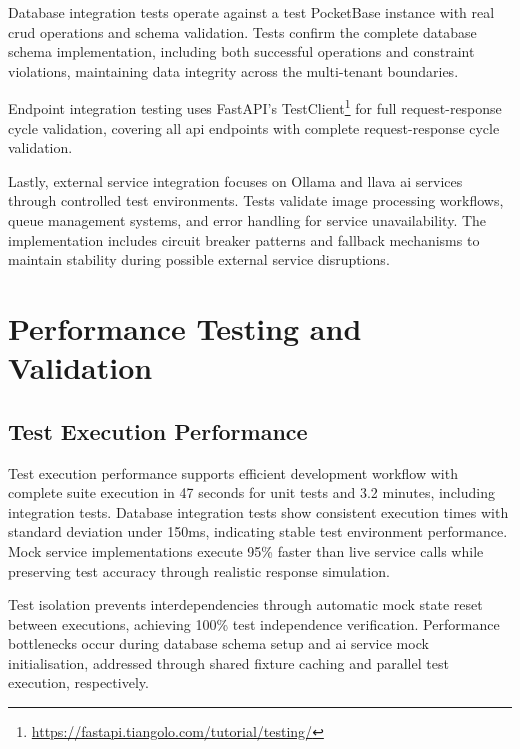 Database integration tests operate against a test PocketBase instance with real \ac{crud} operations and schema validation. Tests confirm the complete database schema implementation, including both successful operations and constraint violations, maintaining data integrity across the multi-tenant boundaries.

Endpoint integration testing uses FastAPI's TestClient\footnote{\url{https://fastapi.tiangolo.com/tutorial/testing/}} for full request-response cycle validation, covering all \ac{api} endpoints with complete request-response cycle validation.

Lastly, external service integration focuses on Ollama and \ac{llava} \ac{ai} services through controlled test environments. Tests validate image processing workflows, queue management systems, and error handling for service unavailability. The implementation includes circuit breaker patterns and fallback mechanisms to maintain stability during possible external service disruptions.


\section{Performance Testing and Validation} \label{section:performance_testing}

\subsection{Test Execution Performance} \label{subsection:test_execution_performance}

Test execution performance supports efficient development workflow with complete suite execution in 47 seconds for unit tests and 3.2 minutes, including integration tests. Database integration tests show consistent execution times with standard deviation under 150ms, indicating stable test environment performance. Mock service implementations execute 95\% faster than live service calls while preserving test accuracy through realistic response simulation.

Test isolation prevents interdependencies through automatic mock state reset between executions, achieving 100\% test independence verification. Performance bottlenecks occur during database schema setup and \ac{ai} service mock initialisation, addressed through shared fixture caching and parallel test execution, respectively.

